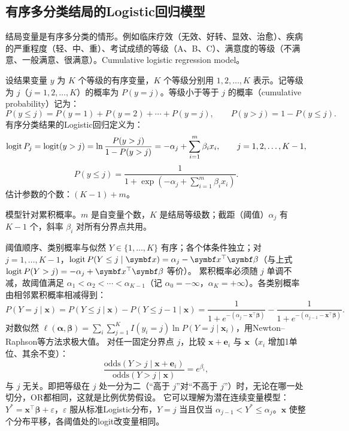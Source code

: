 \subsection{有序多分类结局的Logistic回归模型}
结局变量是有序多分类的情形。例如临床疗效（无效、好转、显效、治愈）、疾病的严重程度（轻、中、重）、考试成绩的等级（A、B、C）、满意度的等级（不满意、一般满意、很满意）。Cumulative logistic regression model。

设结果变量 $y$ 为 $K$ 个等级的有序变量，$K$ 个等级分别用 $1,2,\ldots,K$ 表示。记等级为 $j$（$j=1,2,\ldots,K$）的概率为 $P(y=j)$。等级小于等于 $j$ 的概率（cumulative probability）记为：
\[
P(y\le j)=P(y=1)+P(y=2)+\cdots+P(y=j),\qquad P(y>j)=1-P(y\le j).
\]
有序分类结果的Logistic回归定义为：
\[
\operatorname{logit} P_j=\operatorname{logit}(y>j)=\ln\frac{P(y>j)}{1-P(y>j)}
=-\alpha_j+\sum_{i=1}^m\beta_ix_i,\qquad j=1,2,\ldots,K-1,
\]
\[
P(y\le j)=\frac1{1+\exp(-\alpha_j+\sum_{i=1}^m\beta_ix_i)}.
\]
估计参数的个数：$(K-1)+m$。
\begin{annotation}模型针对累积概率。$m$ 是自变量个数，$K$ 是结局等级数；截距（阈值）$\alpha_j$ 有 $K-1$ 个，斜率 $\beta_i$ 对所有分界点共用。\end{annotation}
\begin{derivation}{阈值顺序、类别概率与似然}
$Y\in\{1,\ldots,K\}$ 有序；各个体条件独立；对 $j=1,\ldots,K-1$，$\logit P(Y\le j\mid\bm x)=\alpha_j-\bm x^\top\bm\beta$（与上式 $\logit P(Y>j)=-\alpha_j+\bm x^\top\bm\beta$ 等价）。
累积概率必须随 $j$ 单调不减，故阈值满足 $\alpha_1<\alpha_2<\cdots<\alpha_{K-1}$（记 $\alpha_0=-\infty$，$\alpha_K=+\infty$）。各类别概率由相邻累积概率相减得到：
\[
P(Y=j\mid\bm x)=P(Y\le j\mid\bm x)-P(Y\le j-1\mid\bm x)
=\frac1{1+e^{-(\alpha_j-\bm x^\top\bm\beta)}}-\frac1{1+e^{-(\alpha_{j-1}-\bm x^\top\bm\beta)}} .
\]
对数似然 $\ell(\bm\alpha,\bm\beta)=\sum_i\sum_{j=1}^K I(y_i=j)\ln P(Y=j\mid\bm x_i)$，用Newton--Raphson等方法求极大值。
对任一固定分界点 $j$，比较 $\bm x+\bm e_i$ 与 $\bm x$（$x_i$ 增加1单位、其余不变）：
\[
\frac{\text{odds}(Y>j\mid\bm x+\bm e_i)}{\text{odds}(Y>j\mid\bm x)}=e^{\beta_i},
\]
与 $j$ 无关。即把等级在 $j$ 处一分为二（“高于 $j$”对“不高于 $j$”）时，无论在哪一处切分，OR都相同，这就是比例优势假设。
它可以理解为潜在连续变量模型：$Y^*=\bm x^\top\bm\beta+\varepsilon$，$\varepsilon$ 服从标准Logistic分布，$Y=j$ 当且仅当 $\alpha_{j-1}<Y^*\le\alpha_j$。$\bm x$ 使整个分布平移，各阈值处的logit改变量相同。
\end{derivation}
